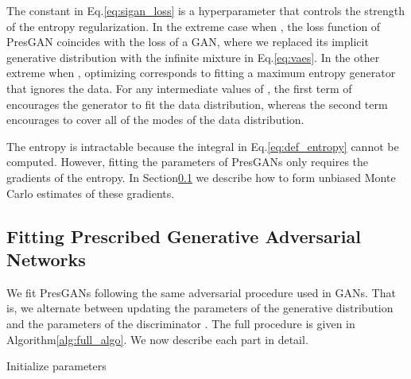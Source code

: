 \documentclass[11pt]{article}
\begin{document}
The constant  in Eq.\nobreakspace \ref {eq:sigan_loss} is a hyperparameter that controls the strength of the entropy regularization. 
In the extreme case when , the loss function of Pres\gls{GAN} coincides with the loss of a \gls{GAN}, where we replaced its implicit generative distribution with the infinite mixture in Eq.\nobreakspace \ref {eq:vaes}. In the other extreme when , optimizing  corresponds to fitting a maximum entropy generator that ignores the data. For any intermediate values of , the first term of  encourages the generator to fit the data distribution, whereas the second term encourages to cover all of the modes of the data distribution.

The entropy  is intractable because the integral in Eq.\nobreakspace \ref {eq:def_entropy} cannot be computed. However, fitting the parameters  of Pres\glspl{GAN} only requires the gradients of the entropy. In Section\nobreakspace \ref {sec:fitting} we describe how to form unbiased Monte Carlo estimates of these gradients.

\subsection{Fitting Prescribed Generative Adversarial Networks}\label{sec:fitting}
We fit Pres\glspl{GAN} following the same adversarial procedure used in \glspl{GAN}. That is, we alternate between updating the parameters of the generative distribution  and the parameters of the discriminator . The full procedure is given in Algorithm\nobreakspace \ref {alg:full_algo}.
We now describe each part in detail. 

\begin{algorithm}[t]
  \SetAlgoNoLine
    \DontPrintSemicolon
    Initialize parameters \;
    \caption{Learning with Prescribed Generative Adversarial Networks (Pres\glspl{GAN}) \label{alg:full_algo}}
 \end{algorithm}
\end{document}
